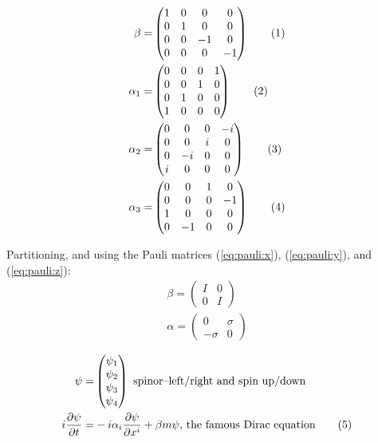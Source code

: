 \documentclass[]{article}
\newcommand\numberthis{\addtocounter{equation}{1}\tag{\theequation}}
\begin{document}
\begin{align*}
	\beta =& \begin{pmatrix}
		1&0&0&0\\
		0&1&0&0\\
		0&0&-1&0\\
		0&0&0&-1
	\end{pmatrix} \numberthis \label{eq:beta:1}\\
	\alpha_1 =& \begin{pmatrix}
		0&0&0&1\\
		0&0&1&0\\
		0&1&0&0\\
		1&0&0&0
	\end{pmatrix}\numberthis \label{eq:alpha1:1}\\ 
	\alpha_2 =& \begin{pmatrix}
		0&0&0&-i\\
		0&0&i&0\\
		0&-i&0&0\\
		i&0&0&0
	\end{pmatrix} \numberthis \label{eq:alpha2:1} \\ 
	\alpha_3 =& \begin{pmatrix}
		0&0&1&0\\
		0&0&0&-1\\
		1&0&0&0\\
		0&-1&0&0 
	\end{pmatrix} \numberthis \label{eq:alpha3:1}
\end{align*}

Partitioning, and using the Pauli matrices (\ref{eq:pauli:x}), (\ref{eq:pauli:y}), and (\ref{eq:pauli:z}):
\begin{align*}
	\beta = \begin{pmatrix}
		I&0\\
		0&I
	\end{pmatrix}\\
	\alpha = \begin{pmatrix}
		0&\sigma\\
		-\sigma&0
	\end{pmatrix}
\end{align*}

\begin{align*}
	\psi =& \begin{pmatrix}
		\psi_1\\
		\psi_2\\
		\psi_3\\
		\psi_4
	\end{pmatrix} \text{ spinor--left/right and spin up/down}\\
	i \frac{\partial \psi}{\partial t} =& -i \alpha_i \frac{\partial \psi}{\partial x^i} + \beta m \psi \text{, the famous Dirac equation} \numberthis \label{eq:famous:dirac}
\end{align*}
\end{document}
